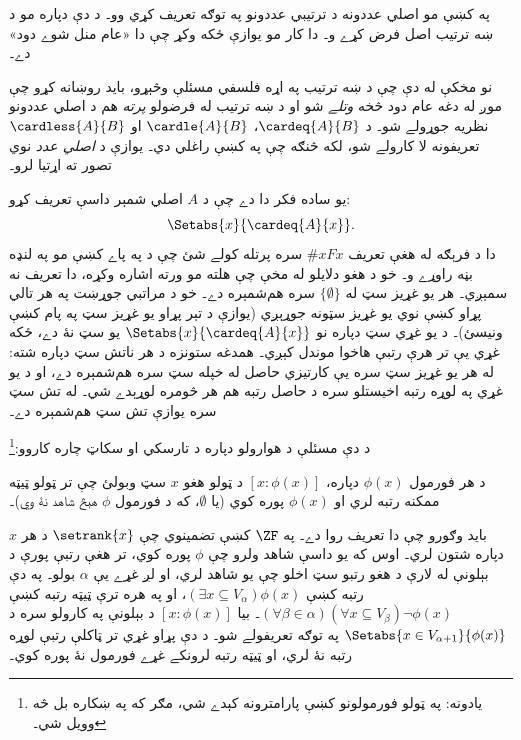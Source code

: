 \documentclass[../../../include/open-logic-section]{subfiles}
\begin{document}

په  کښې مو
اصلي عددونه د ترتيبي عددونو په توګه تعريف کړي وو۔ د دې دپاره
مو د ښه ترتيب اصل فرض کړے و۔ دا کار مو يوازې ځکه وکړ چې دا
«عام منل شوے دود» دے۔

نو مخکې له دې چې د ښه ترتيب په اړه فلسفي مسئلې وڅېړو،
بايد روښانه کړو چې موږ له دغه عام دود څخه \emph{وتلے}
شو او د ښه ترتيب له فرضولو \emph{پرته} هم د اصلي عددونو
نظريه جوړولے شو۔ د $\cardeq{A}{B}$، $\cardle{A}{B}$
او $\cardless{A}{B}$ تعريفونه لا کارولے شو، لکه څنګه
چې په  کښې راغلي دي۔ يوازې
د \emph{اصلي عدد} نوي تصور ته اړتيا لرو۔

يو ساده فکر دا دے چې د $A$ اصلي شمېر داسې تعريف کړو:
\[
	\Setabs{x}{\cardeq{A}{x}}.
\]
دا د فرېګه له هغې تعريف $\# x Fx$ سره پرتله کولے
شئ چې د  په پاے کښې مو
په لنډه بڼه راوړے و۔ خو د هغو دلايلو له مخې چې هلته
مو ورته اشاره وکړه، دا تعريف نه سمېږي۔ هر يو غړيز
سټ له $\{\emptyset\}$ سره هم‌شمېره دے۔ خو د مراتبي
جوړښت په هر تالي پړاو کښې نوي يو غړيز سټونه جوړېږي
(يوازې د تېر پړاو يو غړيز سټ په پام کښې ونيسئ)۔
د يو غړي سټ دپاره نو $\Setabs{x}{\cardeq{A}{x}}$
يو سټ نۀ دے، ځکه غړي يې تر هرې رتبې هاخوا موندل کېږي۔
همدغه ستونزه د هر ناتش سټ دپاره شته: له هر يو غړيز سټ
سره يې کارتيزي حاصل له خپله سټ سره هم‌شمېره دے، او
د يو غړي په لوړه رتبه اخيستلو سره د حاصل رتبه هم
هر څومره لوړېدے شي۔ له تش سټ سره يوازې تش سټ هم‌شمېره
دے۔

د دې مسئلې د هوارولو دپاره د تارسکي او سکاټ
چاره کاروو:\footnote{يادونه: په ټولو فورمولونو کښې
پارامترونه کېدے شي، مګر که په ښکاره بل څه وويل شي۔}

\begin{defn}
د هر فورمول $\phi(x)$ دپاره،
$[ x : \phi(x)] $ د ټولو هغو $x$ سټ وبولئ چې
تر ټولو ټيټه ممکنه رتبه لري او $\phi(x)$ پوره کوي
(يا $\emptyset$، که د فورمول $\phi$ هېڅ شاهد نۀ وي)۔
\end{defn}

بايد وګورو چې دا تعريف روا دے۔ په $\ZF$ کښې
 تضمينوي
چې $\setrank{x}$ د هر $x$ دپاره شتون لري۔ اوس که
يو داسې شاهد ولرو چې $\phi$ پوره کوي، تر هغې رتبې
پورې د بېلونې له لارې د هغو رتبو سټ اخلو چې يو شاهد
لري، او لږ غړے يې $\alpha$ بولو۔ په دې رتبه کښې
$(\exists x\subseteq V_\alpha)\phi(x)$، او په هره
ترې ټيټه رتبه کښې
$(\forall \beta
\in \alpha)(\forall x \subseteq V_\beta)\lnot \phi(x)$۔
بيا $[x : \phi(x)]$ د بېلونې په کارولو سره د
$\Setabs{x \in
V_{\alpha+1}}{\phi(x)}$ په توګه تعريفولے شو۔ د دې
پړاو غړي تر ټاکلې رتبې لوړه رتبه نۀ لري، او ټيټه
رتبه لرونکے غړے فورمول نۀ پوره کوي۔
\end{document}

